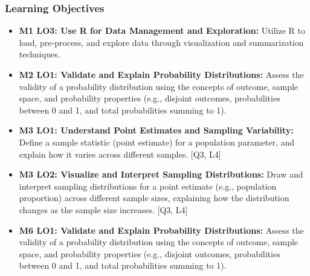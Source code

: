 \begin{frame}
\frametitle{Learning Objectives}
\begin{itemize}
    \item \textbf{M1 LO3: Use R for Data Management and Exploration:} Utilize R to load, pre-process, and explore data through visualization and summarization techniques.
    \item \textbf{M2 LO1: Validate and Explain Probability Distributions:} Assess the validity of a probability distribution using the concepts of outcome, sample space, and probability properties (e.g., disjoint outcomes, probabilities between 0 and 1, and total probabilities summing to 1).
    \item \textbf{M3 LO1: Understand Point Estimates and Sampling Variability:} Define a sample statistic (point estimate) for a population parameter, and explain how it varies across different samples. [Q3, L4] 
    \item \textbf{M3 LO2: Visualize and Interpret Sampling Distributions:} Draw and interpret sampling distributions for a point estimate (e.g., population proportion) across different sample sizes, explaining how the distribution changes as the sample size increases. [Q3, L4]     \item \textbf{M6 LO1: Validate and Explain Probability Distributions:} Assess the validity of a probability distribution using the concepts of outcome, sample space, and probability properties (e.g., disjoint outcomes, probabilities between 0 and 1, and total probabilities summing to 1).
\end{itemize}
\end{frame}

